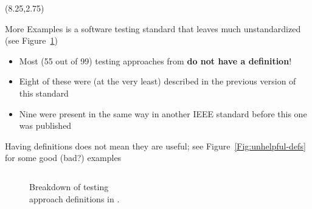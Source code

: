 \documentclass[22pt]{beamer}
\begin{document}
\begin{frame}[fragile]
    \begin{textblock}{7.25}(8.25,2.75)
        \begin{block}{\fontsize{37}{20}\selectfont More Examples}
            \cite{IEEE2022} is a software testing standard that
            leaves much unstandardized (see Figure~\ref{Fig:IEEEdefs})
            \begin{itemize}
                \item Most (55 out of 99) testing approaches from \cite{IEEE2022}
                      \textbf{do not have a definition}!
                \item Eight of these were (at the very least) described in the
                      previous version of this standard \cite{IEEE2013}
                \item Nine were present in the same way in another IEEE
                      standard \cite{IEEE2017} before this one was published
            \end{itemize}
            \vspace{5mm}
            Having definitions does not mean they are useful; see
            Figure~\ref{Fig:unhelpful-defs} for some good (bad?) examples
            \vspace{-8mm}
            \begin{columns}
                \begin{column}{0.375\textwidth}
                    \begin{center}
                        \begin{figure}
                            \caption{Breakdown of testing\\approach definitions in
                                \cite{IEEE2022}.}
                            \label{Fig:IEEEdefs}
                        \end{figure}
                    \end{center}
                \end{column}

\end{columns}
\end{block}
\end{textblock}
\end{frame}
\end{document}
